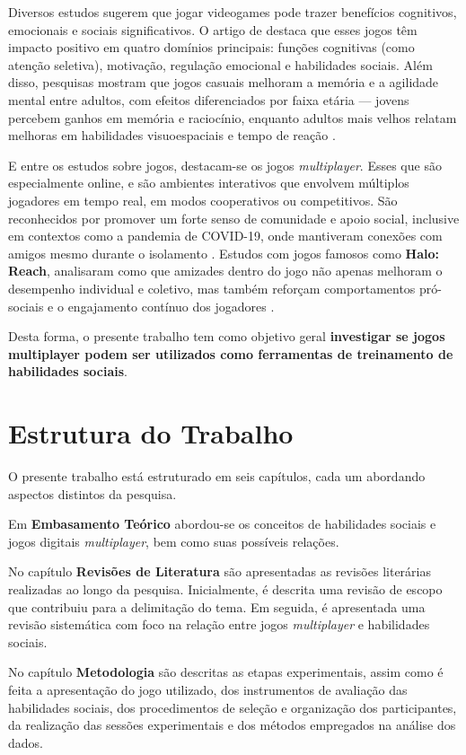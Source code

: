 Diversos estudos sugerem que jogar videogames pode trazer benefícios cognitivos, emocionais e sociais significativos. O artigo de   destaca que esses jogos têm impacto positivo em quatro domínios principais: funções cognitivas (como atenção seletiva), motivação, regulação emocional e habilidades sociais. Além disso, pesquisas mostram que jogos casuais melhoram a memória e a agilidade mental entre adultos, com efeitos diferenciados por faixa etária — jovens percebem ganhos em memória e raciocínio, enquanto adultos mais velhos relatam melhoras em habilidades visuoespaciais e tempo de reação \cite{whitbourne2013}.

E entre os estudos sobre jogos, destacam-se os jogos \textit{multiplayer}. Esses que são especialmente online, e são ambientes interativos que envolvem múltiplos jogadores em tempo real, em modos cooperativos ou competitivos. São reconhecidos por promover um forte senso de comunidade e apoio social, inclusive em contextos como a pandemia de COVID-19, onde mantiveram conexões com amigos mesmo durante o isolamento \cite{cmentowski2020}. Estudos com jogos famosos como \textbf{Halo: Reach}, analisaram como que amizades dentro do jogo não apenas melhoram o desempenho individual e coletivo, mas também reforçam comportamentos pró-sociais e o engajamento contínuo dos jogadores \cite{mason2012}.

Desta forma, o presente trabalho tem como objetivo geral \textbf{investigar se jogos multiplayer podem ser utilizados como ferramentas de treinamento de habilidades sociais}.

\section{Estrutura do Trabalho}


O presente trabalho está estruturado em seis capítulos, cada um abordando aspectos distintos da pesquisa.

Em \textbf{Embasamento Teórico}  abordou-se os conceitos de habilidades sociais e jogos digitais \textit{multiplayer}, bem como suas possíveis relações.

No capítulo \textbf{Revisões de Literatura} são apresentadas as revisões literárias realizadas ao longo da pesquisa. Inicialmente, é descrita uma revisão de escopo que contribuiu para a delimitação do tema. Em seguida, é apresentada uma revisão sistemática com foco na relação entre jogos \textit{multiplayer} e habilidades sociais.

No capítulo \textbf{Metodologia} são descritas as etapas experimentais, assim como é feita a apresentação do jogo utilizado, dos instrumentos de avaliação das habilidades sociais, dos procedimentos de seleção e organização dos participantes, da realização das sessões experimentais e dos métodos empregados na análise dos dados.


